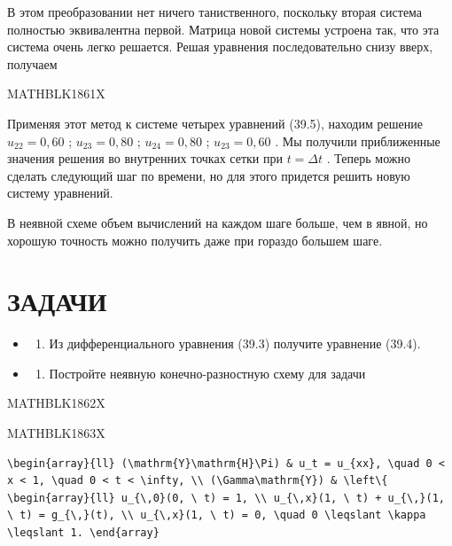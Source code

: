 \documentclass[
]{article}
\providecommand{\tightlist}{%
  \setlength{\itemsep}{0pt}\setlength{\parskip}{0pt}}
\begin{document}
{{{В этом преобразовании нет ничего таниственного, поскольку вторая система
полностью эквивалентна первой. Матрица новой системы устроена так, что
эта система очень легко решается. Решая уравнения последовательно снизу
вверх, получаем

MATHBLK1861X

Применяя этот метод к системе четырех уравнений (39.5), находим решение
\(u_{22}=0,60\) ; \(u_{23}=0,80\) ; \(u_{24}=0,80\) ; \(u_{23}=0,60\) .
Мы получили приближенные значения решения во внутренних точках сетки при
\(t=\Delta t\) . Теперь можно сделать следующий шаг по времени, но для
этого придется решить новую систему уравнений.

В неявной схеме объем вычислений на каждом шаге больше, чем в явной, но
хорошую точность можно получить даже при гораздо большем шаге.

\section{ЗАДАЧИ}\label{ux437ux430ux434ux430ux447ux438-17}

\begin{itemize}
\tightlist
\item
  \begin{enumerate}
  \def\labelenumi{\arabic{enumi}.}
  \tightlist
  \item
    Из дифференциального уравнения (39.3) получите уравнение (39.4).
  \end{enumerate}
\item
  \begin{enumerate}
  \def\labelenumi{\arabic{enumi}.}
  \setcounter{enumi}{1}
  \tightlist
  \item
    Постройте неявную конечно-разностную схему для задачи
  \end{enumerate}
\end{itemize}

MATHBLK1862X

MATHBLK1863X

\begin{verbatim}
\begin{array}{ll} (\mathrm{Y}\mathrm{H}\Pi) & u_t = u_{xx}, \quad 0 < x < 1, \quad 0 < t < \infty, \\ (\Gamma\mathrm{Y}) & \left\{ \begin{array}{ll} u_{\,0}(0, \ t) = 1, \\ u_{\,x}(1, \ t) + u_{\,}(1, \ t) = g_{\,}(t), \\ u_{\,x}(1, \ t) = 0, \quad 0 \leqslant \kappa \leqslant 1. \end{array}
\end{verbatim}

}}}
\end{document}

